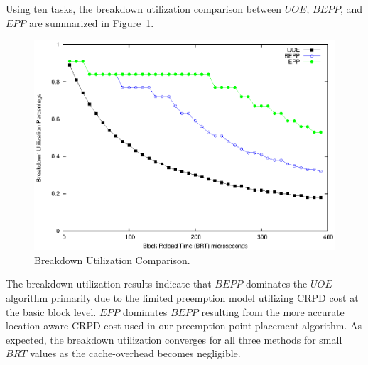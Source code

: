 Using ten tasks, the breakdown utilization comparison between ${UOE}$, ${BEPP}$, and ${EPP}$ are summarized in Figure~\ref{fig:breakdown_utilization}.
\begin{figure}[h!]
\vspace{-10pt}
\begin{center}
\includegraphics[width=\linewidth]{eps/breakdown.eps}
\caption{Breakdown Utilization Comparison.}
\label{fig:breakdown_utilization}
\end{center}
\vspace{-10pt}
\end{figure}
The breakdown utilization results indicate that $BEPP$ dominates the $UOE$ algorithm primarily due to the limited preemption model utilizing CRPD cost at the basic block level.  $EPP$ dominates $BEPP$ resulting from the more accurate location aware CRPD cost used in our preemption point placement algorithm.  As expected, the breakdown utilization converges for all three methods for small ${BRT}$ values as the cache-overhead becomes negligible.
